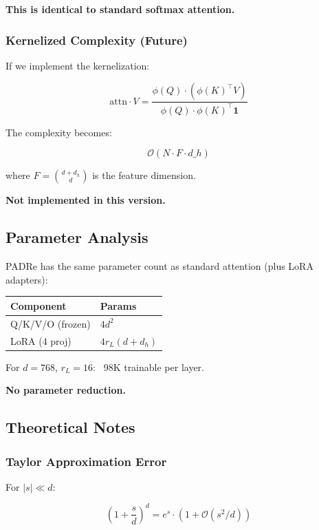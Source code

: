 \textbf{This is identical to standard softmax attention.}

\subsubsection{Kernelized Complexity (Future)}

If we implement the kernelization:

\[
\text{attn} \cdot V = \frac{\phi(Q) \cdot (\phi(K)^\top V)}{\phi(Q) \cdot \phi(K)^\top \mathbf{1}}
\tag{4.13}
\]

The complexity becomes:

\[
\mathcal{O}(N \cdot F \cdot d\_h)
\tag{4.14}
\]

where $F = \binom{d + d_h}{d}$ is the feature dimension.

\textbf{Not implemented in this version.}

\subsection{Parameter Analysis}

PADRe has the same parameter count as standard attention (plus LoRA adapters):

\begin{table}[H]
\centering
\small
\begin{tabular}{ll}
\toprule
\textbf{Component} & \textbf{Params} \\
\midrule
Q/K/V/O (frozen) & $4 d^2$ \\
LoRA (4 proj) & $4 r_L (d + d_h)$ \\
\bottomrule
\end{tabular}
\end{table}

For $d = 768$, $r_L = 16$: ~98K trainable per layer.

\textbf{No parameter reduction.}

\subsection{Theoretical Notes}

\subsubsection{Taylor Approximation Error}

For $|s| \ll d$:

\[
\left(1 + \frac{s}{d}\right)^d = e^s \cdot (1 + \mathcal{O}(s^2/d))
\tag{4.15}
\]

